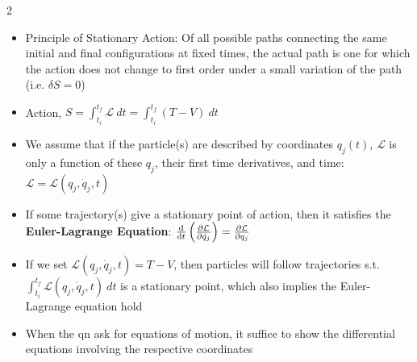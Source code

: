 \documentclass[10pt, portrait]{article}
\renewcommand{\bf}[1]{\textbf{#1}}
\begin{document}
\begin{multicols*}{2}
\begin{itemize}
\[\begin{aligned}
        \ddot{\theta} &= -\frac{g}{l}\sin\theta
    \end{aligned}
    \]
    \item Principle of Stationary Action: Of all possible paths connecting the same initial and final configurations at fixed times, the actual path is one for which the action does not change to first order under a small variation of the path (i.e. $\delta S = 0$)
    \item Action, $S = \int_{t_i}^{t_f} \mathcal{L} \ dt = \int_{t_i}^{t_f} (T - V) \ dt$
    \item We assume that if the particle(s) are described by coordinates ${q_j(t)}$, $\mathcal{L}$ is only a function of these $q_j$, their first time derivatives, and time: $\mathcal{L} = \mathcal{L}(q_j, \dot{q}_j, t)$
    \item If some trajectory(s) give a stationary point of action, then it satisfies the \bf{Euler-Lagrange Equation}: $\dv{t}\left(\pdv{\mathcal{L}}{\dot{q}_j}\right) = \pdv{\mathcal{L}}{q_j}$
    \item If we set $\mathcal{L}(q_j, \dot{q}_j, t) = T - V$, then particles will follow trajectories s.t. $\int_{t_i}^{t_f} \mathcal{L}(q_j, \dot{q}_j, t) \ dt$ is a stationary point, which also implies the Euler-Lagrange equation hold
    \item When the qn ask for equations of motion, it suffice to show the differential equations involving the respective coordinates
\end{itemize}


\end{multicols*}
\end{document}

